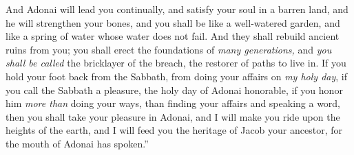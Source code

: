 \begin{biblechapter}
\verse And Adonai will lead you continually, and satisfy your soul in a barren land, 
and he will strengthen your bones, 
and you shall be like a well-watered garden, 
and like a spring of water whose water does not fail.
\verse And they shall rebuild ancient ruins from you; 
you shall erect the foundations of \textit{many generations,} 
and \textit{you shall be called} the bricklayer of the breach, 
the restorer of paths to live in.
\verse If you hold your foot back from the Sabbath, 
from doing your affairs on \textit{my holy day}, 
if you call the Sabbath a pleasure, 
the holy day of Adonai honorable, 
if you honor him \textit{more than} doing your ways, 
than finding your affairs and speaking a word,
\verse then you shall take your pleasure in Adonai, 
and I will make you ride upon the heights of the earth, 
and I will feed you the heritage of Jacob your ancestor, for the mouth of Adonai has spoken.”
\end{biblechapter}

